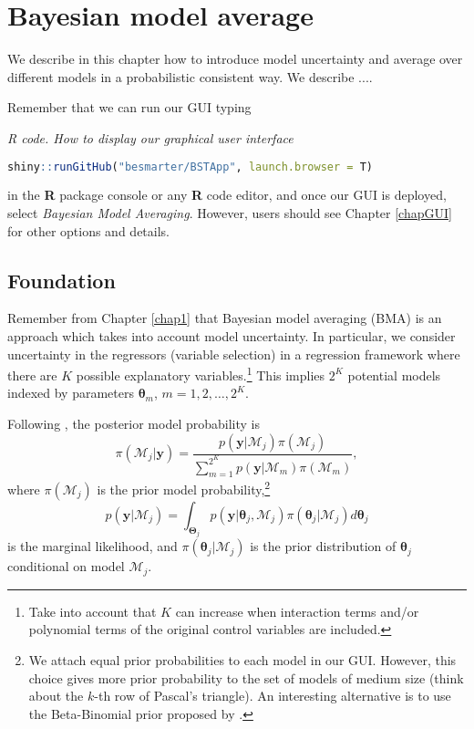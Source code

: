 \chapter{Bayesian model average}\label{chap10}

We describe in this chapter how to introduce model uncertainty and average over different models in a probabilistic consistent way. We describe .... 

Remember that we can run our GUI typing

\begin{tcolorbox}[enhanced,width=4.67in,center upper,
	fontupper=\large\bfseries,drop shadow southwest,sharp corners]
	\textit{R code. How to display our graphical user interface}
	\begin{VF}
		\begin{lstlisting}[language=R]
	shiny::runGitHub("besmarter/BSTApp", launch.browser = T)\end{lstlisting}
	\end{VF}
\end{tcolorbox} 

in the \textbf{R} package console or any \textbf{R} code editor, and once our GUI is deployed, select \textit{Bayesian Model Averaging}. However, users should see Chapter \ref{chapGUI} for other options and details.

\section{Foundation}\label{sec10_1}
Remember from Chapter \ref{chap1} that Bayesian model averaging (BMA) is an approach which takes into account model uncertainty. In particular, we consider uncertainty in the regressors (variable selection) in a regression framework where there are $K$ possible explanatory variables.\footnote{Take into account that $K$ can increase when interaction terms and/or polynomial terms of the original control variables are included.} This implies $2^K$ potential models indexed by parameters $\bm{\theta}_m$, $m=1,2,\dots,2^K$.

Following \cite{Simmons2010}, the posterior model probability is
\begin{equation*}
	\pi(\mathcal{M}_j |\bm{y})=\frac{p(\bm{y} | \mathcal{M}_j)\pi(\mathcal{M}_j)}{\sum_{m=1}^{2^K}p(\bm{y} | \mathcal{M}_m)\pi(\mathcal{M}_m)},
\end{equation*}
where $\pi(\mathcal{M}_j)$ is the prior model probability,\footnote{We attach equal prior probabilities to each model in our GUI. However, this choice gives more prior probability to the set of models of medium size (think about the $k$-th row of Pascal's triangle). An interesting alternative is to use the Beta-Binomial prior proposed by \cite{ley2009effect}.} 
\begin{equation*}
	p(\bm{y} | \mathcal{M}_j)=\int_{\bm{\Theta}_j} p(\bm{y}| \bm{\theta}_j,\mathcal{M}_j)\pi(\bm{\theta}_j | \mathcal{M}_j) d\bm{\theta}_{j}
\end{equation*}
is the marginal likelihood, and $\pi(\bm{\theta}_j | \mathcal{M}_j)$ is the prior distribution of $\bm{\theta}_j$ conditional on model $\mathcal{M}_j$.

